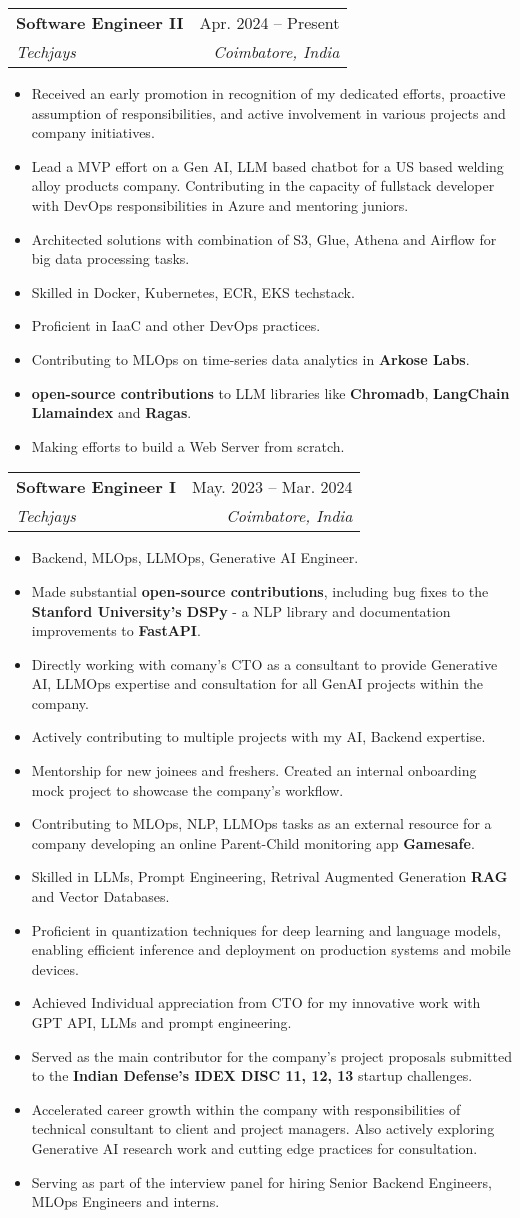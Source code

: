 \documentclass[letterpaper,11pt]{article}
\makeatletter
\newcommand{\resumeItem}[1]{
  \item\small{
    {#1 \vspace{-2pt}}
  }
}
\newcommand{\resumeSubheading}[4]{
  \vspace{-2pt}\item
    \begin{tabular*}{0.97\textwidth}[t]{l@{\extracolsep{\fill}}r}
      \textbf{#1} & #2 \\
      \textit{\small#3} & \textit{\small #4} \\
    \end{tabular*}\vspace{-7pt}
}
\newcommand{\resumeItemListStart}{\begin{itemize}}
\newcommand{\resumeItemListEnd}{\end{itemize}\vspace{-5pt}}
\makeatother
\begin{document}
    \resumeSubheading
      {Software Engineer II}{Apr. 2024 -- Present}
      {Techjays}{Coimbatore, India}
      \resumeItemListStart
        \resumeItem{ Received an early promotion in recognition of my dedicated efforts, proactive assumption of responsibilities, and active involvement in various projects and company initiatives.}
        \resumeItem{Lead a MVP effort on a Gen AI, LLM based chatbot for a US based welding alloy products company. Contributing in the capacity of fullstack developer with DevOps responsibilities in Azure and mentoring juniors.}
        \resumeItem{ Architected solutions with combination of S3, Glue, Athena and Airflow for big data processing tasks.}
        \resumeItem{ Skilled in Docker, Kubernetes, ECR, EKS techstack.}
        \resumeItem{ Proficient in IaaC and other DevOps practices.}
        \resumeItem{ Contributing to MLOps on time-series data analytics in \textbf{Arkose Labs}.}
        \resumeItem{ \textbf{open-source contributions} to LLM libraries like \textbf{Chromadb}, \textbf{LangChain} \textbf{Llamaindex} and \textbf{Ragas}.}
        \resumeItem{Making efforts to build a Web Server from scratch.}
      \resumeItemListEnd
    \resumeSubheading
      {Software Engineer I}{May. 2023 --  Mar. 2024}
      {Techjays}{Coimbatore, India}
      \resumeItemListStart
        \resumeItem{ Backend, MLOps, LLMOps, Generative AI Engineer.}
        \resumeItem{ Made substantial \textbf{open-source contributions}, including bug fixes to the \textbf{Stanford University's DSPy} - a NLP library and documentation improvements to \textbf{FastAPI}.}
        \resumeItem{ Directly working with comany's CTO as a consultant to provide Generative AI, LLMOps expertise and consultation for all GenAI projects within the company.}
        \resumeItem{ Actively contributing to multiple projects with my AI, Backend expertise. }
\resumeItem{Mentorship for new joinees and freshers. Created an internal onboarding mock project to showcase the company's workflow.}
        \resumeItem{ Contributing to MLOps, NLP, LLMOps tasks as an external resource for a company developing an online Parent-Child monitoring app \textbf{Gamesafe}.}
        \resumeItem{ Skilled in LLMs, Prompt Engineering, Retrival Augmented Generation \textbf{RAG} and Vector Databases.}
        \resumeItem{Proficient in quantization techniques for deep learning and language models, enabling efficient inference and deployment on production systems and mobile devices.}
        \resumeItem{ Achieved Individual appreciation from CTO for my innovative work with GPT API, LLMs and prompt engineering. }
        \resumeItem{ Served as the main contributor for the company's project proposals submitted to the \textbf{Indian Defense's IDEX DISC 11, 12, 13} startup challenges.}
        \resumeItem{ Accelerated career growth within the company with responsibilities of technical consultant to client and project managers. Also actively exploring Generative AI research work and cutting edge practices for consultation. }
        \resumeItem{ Serving as part of the interview panel for hiring Senior Backend Engineers, MLOps Engineers and interns.}
      \resumeItemListEnd
\end{document}
